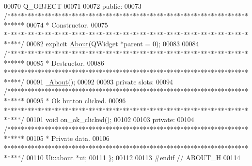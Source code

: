 \begin{DoxyCode}
00070   Q\_OBJECT
00071 
00072 \textcolor{keyword}{public}:
00073   \textcolor{comment}{/*****************************************************************************}
00074 \textcolor{comment}{  * Constructor.}
00075 \textcolor{comment}{  *****************************************************************************/}
00082   \textcolor{keyword}{explicit} \hyperlink{group___window_gab79599ebbcdeffe0a96e00f010e64177}{About}(QWidget *parent = 0);
00083 
00084   \textcolor{comment}{/*****************************************************************************}
00085 \textcolor{comment}{  * Destructor.}
00086 \textcolor{comment}{  *****************************************************************************/}
00091   \hyperlink{group___window_gace60197b1b610998908036ee1f802204}{~About}();
00092 
00093 \textcolor{keyword}{private} slots:
00094   \textcolor{comment}{/*****************************************************************************}
00095 \textcolor{comment}{  * Ok button clicked.}
00096 \textcolor{comment}{  *****************************************************************************/}
00101   \textcolor{keywordtype}{void} on\_ok\_clicked();
00102 
00103 \textcolor{keyword}{private}:
00104   \textcolor{comment}{/*****************************************************************************}
00105 \textcolor{comment}{  * Private data.}
00106 \textcolor{comment}{  *****************************************************************************/}
00110   Ui::about *ui;
00111 \};
00112 
00113 \textcolor{preprocessor}{#endif // ABOUT\_H}
00114 
\end{DoxyCode}
